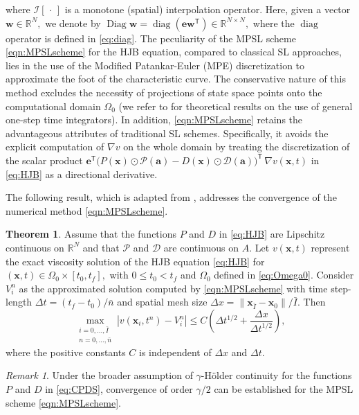 \documentclass[10pt]{article}
\theoremstyle{remark}
\newtheorem{remark}{Remark}[section]
\newcommand{\tpose}{^\mathsf{T}}
\theoremstyle{definition}
\newtheorem{thm}{Theorem}
\theoremstyle{remark}
\DeclareMathOperator{\diag}{diag}
\DeclareMathOperator{\Diag}{Diag}
\begin{document}
where $\mathcal{I}[\, \cdot\, ]$ is a monotone (spatial) interpolation operator. Here, given a vector $\bm{w}\in \mathbb{R}^N,$ we denote by $\Diag\bm{w}=\diag(\bm{e}\bm{w}\tpose)\in \mathbb{R}^{N\times N},$ where the $\diag$ operator is defined in \eqref{eq:diag}. The peculiarity of the MPSL scheme \eqref{eqn:MPSLscheme} for the HJB equation, compared to classical SL approaches, lies in the use of the Modified Patankar-Euler (MPE) discretization \cite{MPEuler}  to approximate the foot of the characteristic curve. The conservative nature of this method excludes the necessity of projections of state space points onto the computational domain $\Omega_0$ (we refer to \cite{Falcone_Ferretti_High} for theoretical results on the use of general one-step time integrators). In addition, \eqref{eqn:MPSLscheme} retains the advantageous attributes of traditional SL schemes. Specifically, it avoids the explicit computation of $\nabla v$ on the whole domain by treating the discretization of the scalar product $\bm{e}\tpose \big(P(\bm{x})\odot \mathcal{P}(\bm{a}) - D(\bm{x})\odot \mathcal{D}(\bm{a}) \big)\tpose \,  \nabla v (\bm{x},t)$ in \eqref{eq:HJB} as a directional derivative.

The following result, which is adapted from \cite[Theorem 3.1]{FalconeGiorgi1999}, addresses the convergence of the numerical method \eqref{eqn:MPSLscheme}.
\begin{thm}\label{thm:SL_Convergence}
    Assume that the functions $P$ and $D$ in \eqref{eq:HJB} are Lipschitz continuous on $\mathbb{R}^N$ and that $\mathcal{P}$ and $\mathcal{D}$ are continuous on $A.$ Let $v(\bm{x},t)$ represent the exact viscosity solution of the HJB equation \eqref{eq:HJB} for $(\bm{x},t)\in \Omega_0 \times [t_0,t_f],$ with $0\leq t_0<t_f$ and $\Omega_0$ defined in \eqref{eq:Omega0}. Consider ${V^n_i}$ as the approximated solution computed by \eqref{eqn:MPSLscheme} with time step-length $\Delta t=(t_f-t_0)/\bar{n}$ and spatial mesh size $\Delta x=\|\bm{x}_{\bar{I}}-\bm{x}_{0}\|/\bar{I}.$ Then 
    \begin{equation}\label{eq:error_estimate}
        \max_{\substack{i=0,\dots, \bar{I} \\ n=0,\dots,\bar{n}}} |v(\bm{x}_i,t^n)-V_i^n|\leq C \left(\Delta t^{1/2}+\dfrac{\Delta x}{\Delta t^{1/2}}\right),
    \end{equation}
    where the positive constants $C$ is independent of $\Delta x$ and $\Delta t.$
\end{thm}

\begin{remark}
    Under the broader assumption of $\gamma$-H\"{o}lder continuity for the functions $P$ and $D$ in \eqref{eq:CPDS}, convergence of order $\gamma/2$ can be established for the MPSL scheme \eqref{eqn:MPSLscheme}.
\end{remark}
\end{document}
